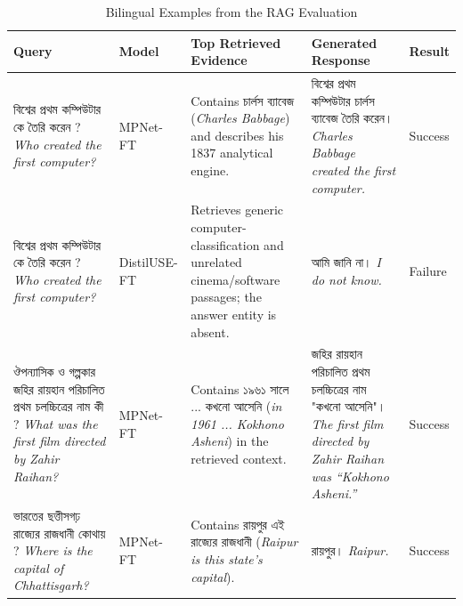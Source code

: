 \documentclass[manuscript,screen,review]{acmart}
\newcommand{\bn}[1]{{\bengalifont #1}}
\begin{document}
\begin{table}[t]
    \centering
    \caption{Bilingual Examples from the RAG Evaluation}
    \label{tab:bengali_rag_examples}
    \small
    \begin{tabularx}{\textwidth}{L{3.2cm}L{1.8cm}Y Y L{1.2cm}}
        \toprule
        \textbf{Query} & \textbf{Model} & \textbf{Top Retrieved Evidence} & \textbf{Generated Response} & \textbf{Result} \\
        \midrule
        \bn{বিশ্বের প্রথম কম্পিউটার কে তৈরি করেন ?} \newline \textit{Who created the first computer?}
        & MPNet-FT
        & Contains \bn{চার্লস ব্যাবেজ} (\textit{Charles Babbage}) and describes his 1837 analytical engine.
        & \bn{বিশ্বের প্রথম কম্পিউটার চার্লস ব্যাবেজ তৈরি করেন।} \newline \textit{Charles Babbage created the first computer.}
        & Success \\
        \midrule
        \bn{বিশ্বের প্রথম কম্পিউটার কে তৈরি করেন ?} \newline \textit{Who created the first computer?}
        & DistilUSE-FT
        & Retrieves generic computer-classification and unrelated cinema/software passages; the answer entity is absent.
        & \bn{আমি জানি না।} \newline \textit{I do not know.}
        & Failure \\
        \midrule
        \bn{ঔপন্যাসিক ও গল্পকার জহির রায়হান পরিচালিত প্রথম চলচ্চিত্রের নাম কী ?} \newline \textit{What was the first film directed by Zahir Raihan?}
        & MPNet-FT
        & Contains \bn{১৯৬১ সালে ... কখনো আসেনি} (\textit{in 1961 ... Kokhono Asheni}) in the retrieved context.
        & \bn{জহির রায়হান পরিচালিত প্রথম চলচ্চিত্রের নাম "কখনো আসেনি"।} \newline \textit{The first film directed by Zahir Raihan was ``Kokhono Asheni.''}
        & Success \\
        \midrule
        \bn{ভারতের ছত্তীসগঢ় রাজ্যের রাজধানী কোথায় ?} \newline \textit{Where is the capital of Chhattisgarh?}
        & MPNet-FT
        & Contains \bn{রায়পুর এই রাজ্যের রাজধানী} (\textit{Raipur is this state's capital}).
        & \bn{রায়পুর।} \newline \textit{Raipur.}
        & Success \\
        \bottomrule
    \end{tabularx}
\end{table}
\end{document}
